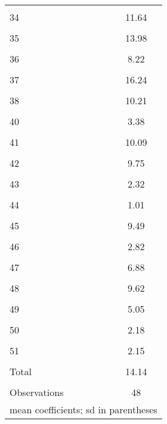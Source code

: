 \begin{table}[htbp]
\begin{tabular}{l*{1}{c}}
                    &            \\
[1em]
34                  &       11.64\\
                    &            \\
[1em]
35                  &       13.98\\
                    &            \\
[1em]
36                  &        8.22\\
                    &            \\
[1em]
37                  &       16.24\\
                    &            \\
[1em]
38                  &       10.21\\
                    &            \\
[1em]
40                  &        3.38\\
                    &            \\
[1em]
41                  &       10.09\\
                    &            \\
[1em]
42                  &        9.75\\
                    &            \\
[1em]
43                  &        2.32\\
                    &            \\
[1em]
44                  &        1.01\\
                    &            \\
[1em]
45                  &        9.49\\
                    &            \\
[1em]
46                  &        2.82\\
                    &            \\
[1em]
47                  &        6.88\\
                    &            \\
[1em]
48                  &        9.62\\
                    &            \\
[1em]
49                  &        5.05\\
                    &            \\
[1em]
50                  &        2.18\\
                    &            \\
[1em]
51                  &        2.15\\
                    &            \\
[1em]
Total               &       14.14\\
                    &            \\
\hline
Observations        &          48\\
\hline\hline
\multicolumn{2}{l}{\footnotesize mean coefficients; sd in parentheses}\\
\end{tabular}
\end{table}
